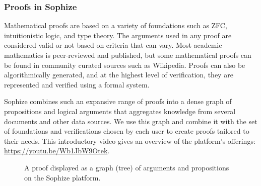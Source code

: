 \documentclass[a4paper]{article}
\begin{document}
\subsubsection*{Proofs in Sophize}
Mathematical proofs are based on a variety of foundations such as ZFC, intuitionistic logic, and type theory. The arguments used in any proof are considered valid or not based on criteria that can vary. Most academic mathematics is peer-reviewed and published, but some mathematical proofs can be found in community curated sources such as Wikipedia. Proofs can also be algorithmically generated, and at the highest level of verification, they are represented and verified using a formal system. 

Sophize combines such an expansive range of proofs into a dense graph of propositions and logical arguments that aggregates knowledge from several documents and other data sources. We use this graph and combine it with the set of foundations and verifications chosen by each user to create proofs tailored to their needs. This introductory video gives an overview of the platform's offerings: \url{https://youtu.be/Wb1JbW9Otek}.

\begin{figure}[htbp]
\begin{center}
\caption{A proof displayed as a graph (tree) of arguments and propositions on the Sophize platform.}
\label{proof_tree}
\end{center}
\end{figure}
\end{document}
